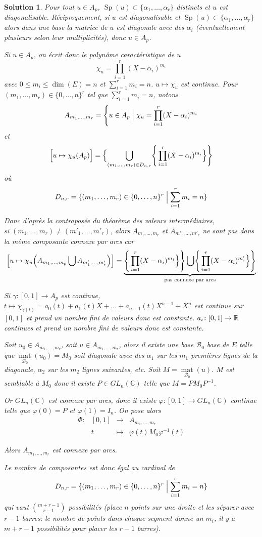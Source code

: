 \documentclass[12pt]{article}
\newtheorem{solution}{Solution}[section]
\theoremstyle{remark}
\newcommand{\C}{\mathbb{C}} \newcommand{\Q}{\mathbb{Q}}
\DeclareMathOperator{\Sp}{Sp} \DeclareMathOperator{\mat}{mat}
\newcommand{\function}[5]{
	$$
	\begin{array}{rccl}
		#1: & #2 & \to & #3 \\
		& #4 & \mapsto & #5
	\end{array}
	$$
}
\numberwithin{equation}{section}
\begin{document}
\begin{solution}
	Pour tout $u\in A_{p}$, $\Sp(u)\subset\{\alpha_{1},\dots,\alpha_{r}\}$ distincts et $u$ est diagonalisable. Réciproquement, si $u$ est diagonalisable et $\Sp(u)\subset\{\alpha_{1},\dots,\alpha_{r}\}$ alors dans une base la matrice de $u$ est diagonale avec des $\alpha_{i}$ (éventuellement plusieurs selon leur multiplicités), donc $u\in A_{p}$.

	Si $u\in A_{p}$, on écrit donc le polynôme caractéristique de $u$
	$$\chi_{u}=\prod_{i=1}^{r}(X-\alpha_{i})^{m_{i}}$$
	avec $0\leqslant m_{i}\leqslant\dim(E)=n$ et $\sum_{i=1}^{r}m_{i}=n$.
	$u\mapsto\chi_{u}$ est continue. Pour $(m_{1},\dots,m_{r})\in\{0,\dots,n\}^{r}$ tel que $\sum_{i=1}^{r}m_{i}=n$, notons 
	$$A_{m_{1},\dots,m_{r}}=\Biggl\{u\in A_{p}\Bigm|\chi_{u}=\prod_{i=1}^{r}(X-\alpha_{i})^{m_{i}}$$
	et 
	$$\Bigl[u\mapsto\chi_u(A_{p})\Bigr]=\Bigl\{\bigcup_{(m_{1},\dots,m_{r})\in D_{n,r}}\Biggr\{\prod_{i=1}^{r}(X-\alpha_{i})^{m_{i}}\Bigr\}\Biggr\}$$
	où
	$$D_{n,r}=\{(m_{1},\dots,m_{r})\in\{0,\dots,n\}^{r}\Bigm|\sum_{i=1}^{r}m_{i}=n\}$$

	Donc d'après la contraposée du théorème des valeurs intermédiaires,\\si $(m_{1},\dots,m_{r})\neq(m'_{1},\dots,m'_{r})$, alors $A_{m_{1},\dots,m_{r}}$ et $A_{m'_{1},\dots,m'_{r}}$ ne sont pas dans la même composante connexe par arcs car
	$$\Bigl[u\mapsto\chi_u\Bigl(A_{m_{1},\dots,m_{p}}\bigcup A_{m'_{1},\dots,m'_{r}}\Bigr)\Bigr]=\underbrace{\Biggr\{\prod_{i=1}^{r}(X-\alpha_{i})^{m_{i}}\Bigr\}\Biggr\}\bigcup\Biggr\{\prod_{i=1}^{r}(X-\alpha_{i})^{m'_{i}}\Bigr\}\Biggr\}}_{\text{pas connexe par arcs}}$$
	
	Si $\gamma\colon[0,1]\to A_{p}$ est continue, $t\mapsto\chi_{\gamma(t)}=a_{0}(t)+a_{1}(t)X+\dots+a_{n-1}(t)X^{n-1}+X^{n}$ est continue sur $[0,1]$ et prend un nombre fini de valeurs donc est constante. $a_{i}\colon[0,1]\to\mathbb{R}$ continues et prend un nombre fini de valeurs donc est constante.

	Soit $u_{0}\in A_{m_{1},\dots,m_{r}}$, soit $u\in A_{m_{1},\dots,m_{r}}$, alors il existe une base $\mathcal{B}_{0}$ base de $E$ telle que $\mat\limits_{\mathcal{B}_{0}}(u_{0})=M_{0}$ soit diagonale avec des $\alpha_{1}$ sur les $m_{1}$ premières lignes de la diagonale, $\alpha_{2}$ sur les $m_{2}$ lignes suivantes, etc. Soit $M=\mat\limits_{\mathcal{B}_{0}}(u)$. $M$ est semblable à $M_{0}$ donc il existe $P\in GL_{n}(\C)$ telle que $M=PM_{0}P^{-1}$.

	Or $GL_{n}(\C)$ est connexe par arcs, donc il existe $\varphi\colon[0,1]\to GL_{n}(\C)$ continue telle que $\varphi(0)=P$ et $\varphi(1)=I_{n}$. On pose alors \function{\Phi}{[0,1]}{A_{m_{1},\dots,m_{r}}}{t}{\varphi(t)M_{0}\varphi^{-1}(t)}
	Alors $A_{m_{1},\dots,m_{r}}$ est connexe par arcs.

	Le nombre de composantes est donc égal au cardinal de 
	$$D_{n,r}=\{(m_{1},\dots,m_{r})\in\{0,\dots,n\}^{r}\Bigm|\sum_{i=1}^{r}m_{i}=n\}$$
	qui vaut $\binom{m+r-1}{r-1}$ possibilités (place $n$ points sur une droite et les séparer avec $r-1$ barres: le nombre de points dans chaque segment donne un $m_{i}$, il y a $m+r-1$ possibilités pour placer les $r-1$ barres).
\end{solution}
\end{document}

